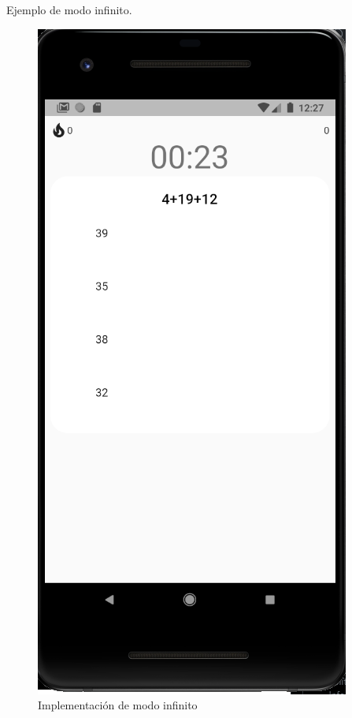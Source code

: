 \documentclass{article}
\begin{document}
Ejemplo de modo infinito.
\begin{figure}[H]
    \centering
    \includegraphics[scale=0.8]{imgs/Imp/Endless}
    \caption{Implementación de modo infinito}
\end{figure}
\end{document}
